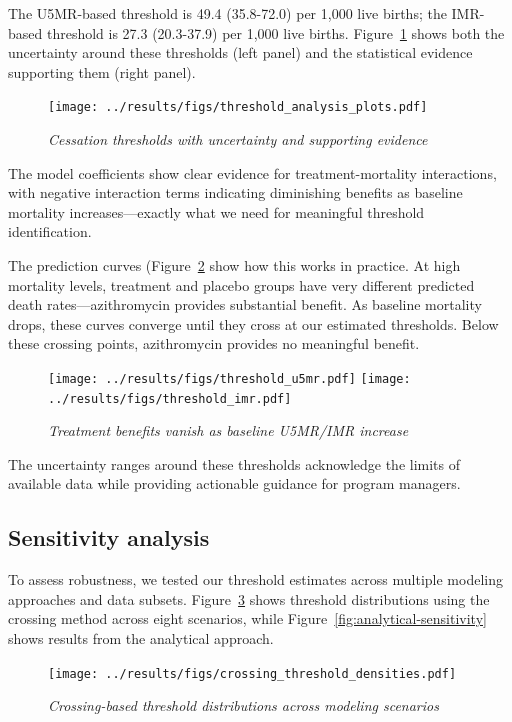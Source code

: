 \documentclass[11pt]{article}\usepackage[]{graphicx}\usepackage[]{xcolor}
\begin{document}
The U5MR-based threshold is 49.4 (35.8-72.0) per 1,000 live births; the IMR-based threshold is 27.3 (20.3-37.9) per 1,000 live births. Figure~\ref{fig:threshold-analysis} shows both the uncertainty around these thresholds (left panel) and the statistical evidence supporting them (right panel).

\begin{figure}[!h]
\centering
\texttt{[image: ../results/figs/threshold\_analysis\_plots.pdf]}
\caption{\emph{Cessation thresholds with uncertainty and supporting evidence}}
\label{fig:threshold-analysis}
\end{figure}

The model coefficients show clear evidence for treatment-mortality interactions, with negative interaction terms indicating diminishing benefits as baseline mortality increases---exactly what we need for meaningful threshold identification.

\newpage
The prediction curves (Figure~\ref{fig:mortality-predictions} show how this works in practice. At high mortality levels, treatment and placebo groups have very different predicted death rates---azithromycin provides substantial benefit. As baseline mortality drops, these curves converge until they cross at our estimated thresholds. Below these crossing points, azithromycin provides no meaningful benefit.

\begin{figure}[!h]
\centering
\texttt{[image: ../results/figs/threshold\_u5mr.pdf]}
\texttt{[image: ../results/figs/threshold\_imr.pdf]}
\caption{\emph{Treatment benefits vanish as baseline U5MR/IMR increase}}
\label{fig:mortality-predictions}
\end{figure}

The uncertainty ranges around these thresholds acknowledge the limits of available data while providing actionable guidance for program managers.

\newpage
\subsection{Sensitivity analysis}

To assess robustness, we tested our threshold estimates across multiple modeling approaches and data subsets. Figure~\ref{fig:crossing-sensitivity} shows threshold distributions using the crossing method across eight scenarios, while Figure~\ref{fig:analytical-sensitivity} shows results from the analytical approach.

\begin{figure}[!h]
\centering
\texttt{[image: ../results/figs/crossing\_threshold\_densities.pdf]}
\caption{\emph{Crossing-based threshold distributions across modeling scenarios}}
\label{fig:crossing-sensitivity}
\end{figure}
\end{document}
